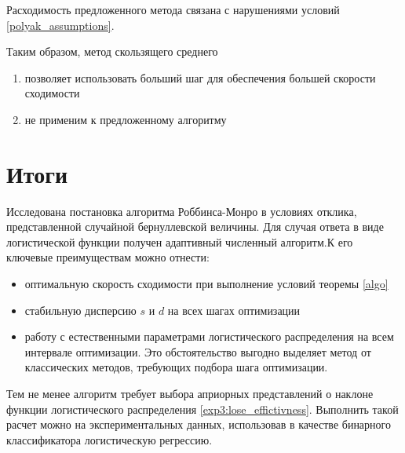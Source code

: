 \documentclass{mipt-thesis-bs}
\begin{document}
Расходимость предложенного метода связана с нарушениями условий \ref{polyak_assumptions}.

Таким образом, метод скользящего среднего \begin{enumerate}
    \item позволяет использовать больший шаг для обеспечения большей скорости сходимости
    \item не применим к предложенному алгоритму
\end{enumerate}

\section{Итоги}
Исследована постановка алгоритма Роббинса-Монро в условиях отклика, представленной случайной бернуллевской величины. 
Для случая ответа в виде логистической функции получен адаптивный численный алгоритм.К его ключевые преимуществам можно отнести:
\begin{itemize}
    \item оптимальную скорость сходимости при выполнение условий теоремы \ref{algo}
    \item стабильную дисперсию $s$ и $d$ на всех шагах оптимизации
    \item работу с естественными параметрами логистического распределения на всем интервале оптимизации. Это обстоятельство выгодно выделяет метод от классических методов, требующих подбора шага оптимизации.
\end{itemize}
Тем не менее алгоритм требует выбора априорных представлений о наклоне функции логистического распределения \ref{exp3:lose_effictivness}. Выполнить такой расчет можно на экспериментальных данных, использовав 
в качестве бинарного классификатора логистическую регрессию.
\end{document}
